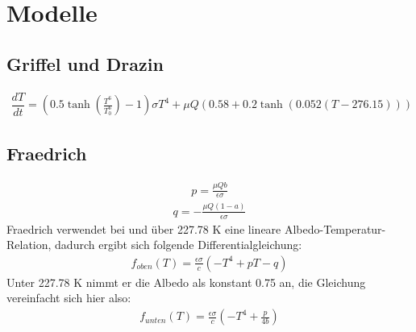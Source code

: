 \documentclass[]{report}
\begin{document}
\chapter{Modelle}
\section{Griffel und Drazin}
	\begin{align}
		\dfrac{dT}{dt} = (0.5 \tanh\left(\frac{T^6}{T_0^6}\right)-1) \sigma T^4 + \mu Q (0.58 + 0.2 \tanh (0.052 (T - 276.15)))
	\end{align}
\section{Fraedrich}
	\begin{align}
		p=\frac{\mu Q b}{\epsilon \sigma}
	\end{align}
	\begin{align}
		q = - \frac{\mu Q (1-a)}{\epsilon \sigma}
	\end{align}
	Fraedrich verwendet bei und über 227.78 K eine lineare Albedo-Temperatur-Relation, dadurch ergibt sich folgende Differentialgleichung:
	\begin{align}
		f_{oben}(T) = \frac{\epsilon \sigma}{c} (-T^4 + p T - q)
	\end{align}
	Unter 227.78 K nimmt er die Albedo als konstant 0.75 an, die Gleichung vereinfacht sich hier also:
	\begin{align}
		f_{unten}(T) = \frac{\epsilon \sigma}{c} (-T^4 + \frac{p}{4b})
	\end{align}
\end{document}
